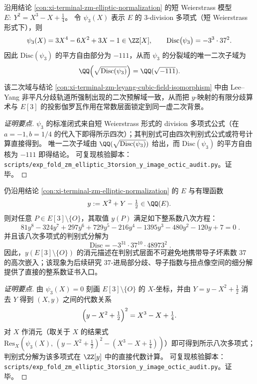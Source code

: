 \begin{conclusion}\label{con:xi-terminal-zm-elliptic-3division-discriminant}
沿用结论 \ref{con:xi-terminal-zm-elliptic-normalization} 的短 Weierstrass 模型
\(
E:\ Y^{2}=X^{3}-X+\tfrac14
\)。
令 \(\psi_{3}(X)\) 表示 \(E\) 的 \(3\)-division 多项式（短 Weierstrass 形式下），则
\[
\psi_{3}(X)=3X^{4}-6X^{2}+3X-1\in\ZZ[X],
\qquad
\mathrm{Disc}\bigl(\psi_{3}\bigr)=-3^{3}\cdot 37^{2}.
\]
因此 \(\mathrm{Disc}(\psi_3)\) 的平方自由部分为 \(-111\)，从而 \(\psi_3\) 的分裂域的唯一二次子域为
\[
\QQ\!\left(\sqrt{\mathrm{Disc}(\psi_3)}\right)=\QQ(\sqrt{-111}).
\]
该二次域与结论 \ref{con:xi-terminal-zm-leyang-cubic-field-isomorphism} 中由 Lee--Yang 非平凡分歧轨道所强制出现的二次预解域一致，从而把 \(y\)-映射的有限分歧算术与 \(E[3]\) 的投影伽罗瓦作用在常数层面锁定到同一虚二次背景。
\end{conclusion}
\begin{proof}[证明要点]
\(\psi_3\) 的标准闭式来自短 Weierstrass 形式的 division 多项式公式（在 \(a=-1,b=1/4\) 的代入下即得所示四次）；其判别式可由四次判别式公式或符号计算直接得到。
唯一二次子域由 \(\QQ(\sqrt{\mathrm{Disc}(\psi_3)})\) 给出，而 \(\mathrm{Disc}(\psi_3)\) 的平方自由核为 \(-111\) 即得结论。
可复现核验脚本：\texttt{scripts/exp\_fold\_zm\_elliptic\_3torsion\_y\_image\_octic\_audit.py}。证毕。
\end{proof}

\begin{conclusion}\label{con:xi-terminal-zm-elliptic-3torsion-y-image-octic}
仍沿用结论 \ref{con:xi-terminal-zm-elliptic-normalization} 的 \(E\) 与有理函数
\[
y:=X^{2}+Y-\tfrac12\in\QQ(E).
\]
则对任意 \(P\in E[3]\setminus\{O\}\)，其取值 \(y(P)\) 满足如下整系数八次方程：
\[
\boxed{\;
81 y^{8}-324 y^{7}+297 y^{6}+729 y^{5}-216 y^{4}-1395 y^{3}-480 y^{2}-120 y+7=0\; }.
\]
并且该八次多项式的判别式分解为
\[
\boxed{\;
\mathrm{Disc}=-3^{31}\cdot 37^{10}\cdot 48973^{2}\; }.
\]
因此，\(y(E[3]\setminus\{O\})\) 的消元描述在判别式层面不可避免地携带导子坏素数 \(37\) 的高次嵌入；该现象为后续研究 \(37\)-进局部分歧、导子指数与扭点像空间的细分解提供了直接的整系数证书入口。
\end{conclusion}
\begin{proof}[证明要点]
由 \(\psi_3(X)=0\) 刻画 \(E[3]\setminus\{O\}\) 的 \(X\)-坐标，并由
\(
Y=y-X^{2}+\tfrac12
\)
消去 \(Y\) 得到 \((X,y)\) 之间的代数关系
\[
\Bigl(y-X^{2}+\tfrac12\Bigr)^{2}=X^{3}-X+\tfrac14.
\]
对 \(X\) 作消元（取关于 \(X\) 的结果式 \(\mathrm{Res}_X(\psi_3(X),\, (y-X^{2}+\tfrac12)^{2}-(X^{3}-X+\tfrac14))\)）即可得到所示八次多项式；
判别式分解为该多项式在 \(\ZZ[y]\) 中的直接代数计算。
可复现核验脚本：\texttt{scripts/exp\_fold\_zm\_elliptic\_3torsion\_y\_image\_octic\_audit.py}。证毕。
\end{proof}

